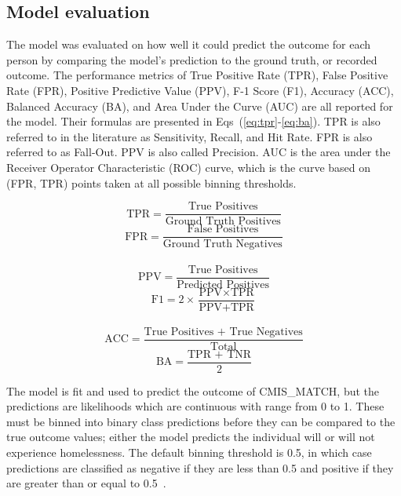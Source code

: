 \documentclass[10pt,letterpaper]{article}
\begin{document}
\subsection*{Model evaluation}
The model was evaluated on how well it could predict the outcome for each person by comparing the model's prediction to the ground truth, or recorded outcome. The performance metrics of True Positive Rate (TPR), False Positive Rate (FPR), Positive Predictive Value (PPV), F-1 Score (F1), Accuracy (ACC), Balanced Accuracy (BA), and Area Under the Curve (AUC) are all reported for the model. Their formulas are presented in Eqs~(\ref{eq:tpr}-\ref{eq:ba}). TPR is also referred to in the literature as Sensitivity, Recall, and Hit Rate. FPR is also referred to as Fall-Out. PPV is also called Precision. AUC is the area under the Receiver Operator Characteristic (ROC) curve, which is the curve based on (FPR, TPR) points taken at all possible binning thresholds.

\begin{multicols}{2}
    \centering
    \begin{equation}
        \text{TPR} = \frac{\text{True Positives}}{\text{Ground Truth Positives}}
        \label{eq:tpr}
    \end{equation}\break
    \begin{equation}
        \text{FPR} = \frac{\text{False Positives}}{\text{Ground Truth Negatives}}
        \label{eq:fpr}
    \end{equation}
    \\
    \begin{equation}
        \text{PPV} = \frac{\text{True Positives}}{\text{Predicted Positives}}
        \label{eq:ppv}
    \end{equation}\break
    \begin{equation}
        \text{F1} = 2\times\frac{\text{PPV}\times\text{TPR}}{\text{PPV} + \text{TPR}}
        \label{eq:f1}
    \end{equation}
    \\
    \begin{equation}
        \text{ACC} = \frac{\text{True Positives + True Negatives}}{\text{Total}}
        \label{eq:acc}
    \end{equation}\break
    \begin{equation}
        \text{BA} = \frac{\text{TPR + TNR}}{2}
        \label{eq:ba}
    \end{equation}
\end{multicols}

The model is fit and used to predict the outcome of CMIS\_MATCH, but the predictions are likelihoods which are continuous with range from 0 to 1. These must be binned into binary class predictions before they can be compared to the true outcome values; either the model predicts the individual will or will not experience homelessness. The default binning threshold is 0.5, in which case predictions are classified as negative if they are less than 0.5 and positive if they are greater than or equal to 0.5~\cite{bewick2005statistics}. 
\end{document}
